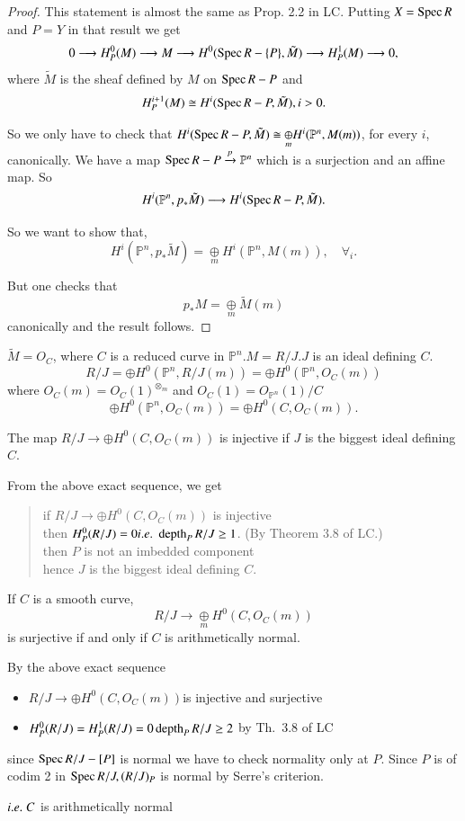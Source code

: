 \begin{proof}
This statement is almost the same as Prop. 2.2 in
LC. Putting $X=\operatorname{Spec} R$ and $P=Y$ in that result we get
$$
0\longrightarrow H_P^0(M)\longrightarrow M\longrightarrow H^0(\operatorname{Spec}
R-\{P\},\tilde{M})\longrightarrow H_P^1(M)\longrightarrow 0,
$$
where $\tilde{M}$ is the sheaf defined by $M$ on $\operatorname{Spec} R-P$ and 
$$
H_P^{i+1}(M)\cong H^i(\operatorname{Spec} R-P,\tilde{M}),i>0.
$$

So we only have to check that $H^i(\operatorname{Spec} R-P,\tilde{M})\cong
\underset{m}{\oplus}H^i(\mathbb{P}^n,M(m))$, for every $i$,
canonically. We have a map $\operatorname{Spec} R-P\xrightarrow{p}\mathbb{P}^n$
which is a surjection and an affine map. So
$$
H^i(\mathbb{P}^n,p_*\tilde{M})\longrightarrow H^i(\operatorname{Spec} R-P,
\tilde{M}).
$$

So we want to show that,
$$
H^i(\mathbb{P}^n,p_*\tilde{M})=\underset{m}{\oplus}H^i(\mathbb{P}^n,M(m)),
\quad \forall_i.
$$\pageoriginale

But one checks that 
$$
p_*M=\underset{m}{\oplus}\tilde{M}(m)
$$
canonically and the result follows.
\end{proof}

\begin{example*}
$\tilde{M}=O_C$, where $C$ is a reduced curve in $\mathbb{P}^n.
M=R/J.J$ is an ideal defining $C$.
$$
R/J=\oplus H^0(\mathbb{P}^n,R/J(m))=\oplus H^0(\mathbb{P}^n,O_C(m))
$$
where $O_C(m)=O_C(1)^{\otimes_m}$ and $O_C(1)=O_{\mathbb{P}^n}(1)/C$
$$
\oplus H^0(\mathbb{P}^n,O_C(m))=\oplus H^0(C,O_C(m)).
$$
\end{example*}

\begin{claim*}
The map $R/J\longrightarrow\oplus H^0(C,O_C(m))$ is injective if $J$
is the biggest ideal defining $C$.

From the above exact sequence, we get 
\begin{quote}
if $R/J\longrightarrow\oplus H^0(C, O_C(m))$ is injective\\
then $H_P^0(R/J)=0{i.e.}\kern.3em\operatorname{depth}_PR/J\geq 1$. (By Theorem 3.8 of LC.)\\
then $P$ is not an imbedded component\\
hence $J$ is the biggest ideal defining $C$.
\end{quote}
\end{claim*}

\begin{claim*}
If $C$ is a smooth curve,
$$
R/J\longrightarrow\underset{m}{\oplus}H^0(C,O_C(m))
$$
is surjective if and only if $C$ is arithmetically normal.

\noindent By the above exact sequence

\begin{itemize}
\item $R/J\longrightarrow\oplus H^0(C,O_C(m))$\pageoriginale is
injective and surjective
\item $H_P^0(R/J)=H_P^1(R/J)=0\operatorname{depth}_PR/J\geq 2$ by Th.~3.8 of LC
\end{itemize}
since $\operatorname{Spec} R/J-[P]$ is normal we have to check normality only at
$P$. Since $P$ is of codim 2 in $\operatorname{Spec} R/J,(R/J)_P$ is normal by
Serre's criterion.

${i.e.}\kern.3em C$ is arithmetically normal
\end{claim*}

